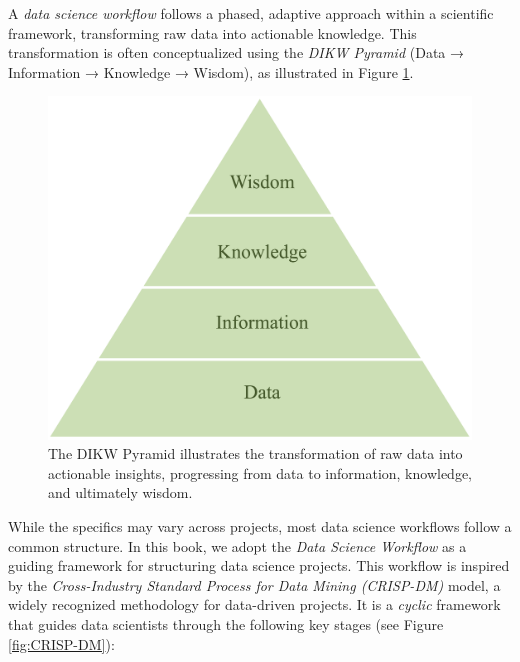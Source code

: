\documentclass[
]{book}
\theoremstyle{definition}
\theoremstyle{definition}
\theoremstyle{definition}
\theoremstyle{definition}
\theoremstyle{remark}
\begin{document}
A \emph{data science workflow} follows a phased, adaptive approach within a scientific framework, transforming raw data into actionable knowledge. This transformation is often conceptualized using the \emph{DIKW Pyramid} (Data → Information → Knowledge → Wisdom), as illustrated in Figure \ref{fig:DIKW-Pyramid}.

\begin{figure}

{\centering \includegraphics[width=0.4\linewidth]{images/ch2_DIKW-Pyramid} 

}

\caption{The DIKW Pyramid illustrates the transformation of raw data into actionable insights, progressing from data to information, knowledge, and ultimately wisdom.}\label{fig:DIKW-Pyramid}
\end{figure}

While the specifics may vary across projects, most data science workflows follow a common structure. In this book, we adopt the \emph{Data Science Workflow} as a guiding framework for structuring data science projects. This workflow is inspired by the \emph{Cross-Industry Standard Process for Data Mining (CRISP-DM)} model, a widely recognized methodology for data-driven projects. It is a \emph{cyclic} framework that guides data scientists through the following key stages (see Figure \ref{fig:CRISP-DM}):
\end{document}
